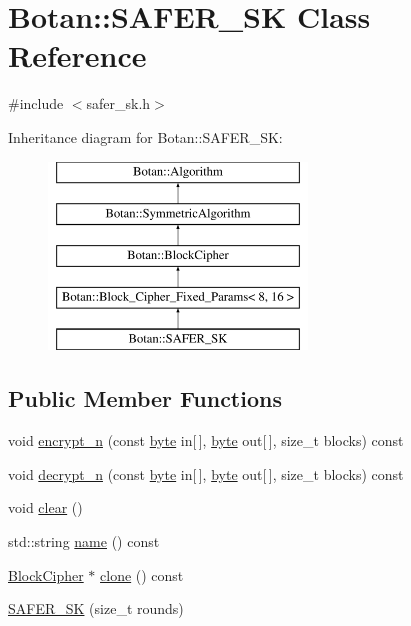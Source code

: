 \hypertarget{classBotan_1_1SAFER__SK}{\section{Botan\-:\-:S\-A\-F\-E\-R\-\_\-\-S\-K Class Reference}
\label{classBotan_1_1SAFER__SK}
}


{\ttfamily \#include $<$safer\-\_\-sk.\-h$>$}

Inheritance diagram for Botan\-:\-:S\-A\-F\-E\-R\-\_\-\-S\-K\-:\begin{figure}[H]
\begin{center}
\leavevmode
\includegraphics[height=5.000000cm]{classBotan_1_1SAFER__SK}
\end{center}
\end{figure}
\subsection*{Public Member Functions}
\begin{DoxyCompactItemize}
\item 
void \hyperlink{classBotan_1_1SAFER__SK_a9cea78adcf065f7604e007033a5ffe14}{encrypt\-\_\-n} (const \hyperlink{namespaceBotan_a7d793989d801281df48c6b19616b8b84}{byte} in\mbox{[}$\,$\mbox{]}, \hyperlink{namespaceBotan_a7d793989d801281df48c6b19616b8b84}{byte} out\mbox{[}$\,$\mbox{]}, size\-\_\-t blocks) const 
\item 
void \hyperlink{classBotan_1_1SAFER__SK_a9b3de957ad9fb20b33d8b9441f166cb0}{decrypt\-\_\-n} (const \hyperlink{namespaceBotan_a7d793989d801281df48c6b19616b8b84}{byte} in\mbox{[}$\,$\mbox{]}, \hyperlink{namespaceBotan_a7d793989d801281df48c6b19616b8b84}{byte} out\mbox{[}$\,$\mbox{]}, size\-\_\-t blocks) const 
\item 
void \hyperlink{classBotan_1_1SAFER__SK_a21332eab33e2f35c95ea4a2ceaf86c64}{clear} ()
\item 
std\-::string \hyperlink{classBotan_1_1SAFER__SK_a2f85d4cab7b9ee352b2e079f163d79a2}{name} () const 
\item 
\hyperlink{classBotan_1_1BlockCipher}{Block\-Cipher} $\ast$ \hyperlink{classBotan_1_1SAFER__SK_a9d9f4946038bd581a0bd6e1c22f1d31e}{clone} () const 
\item 
\hyperlink{classBotan_1_1SAFER__SK_addf346e06b565c87ffb538ce01559f70}{S\-A\-F\-E\-R\-\_\-\-S\-K} (size\-\_\-t rounds)
\end{DoxyCompactItemize}

